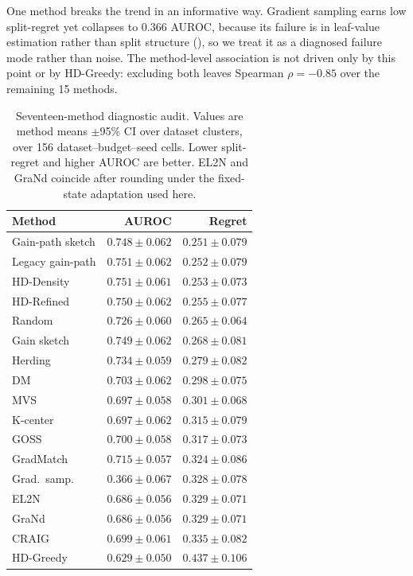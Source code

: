 One method breaks the trend in an informative way. Gradient sampling earns low
split-regret yet collapses to 0.366 AUROC, because its failure is in leaf-value
estimation rather than split structure (), so we treat it as a
diagnosed failure mode rather than noise. The
method-level association is not driven only by this point or by HD-Greedy:
excluding both leaves Spearman $\rho=-0.85$ over the remaining 15 methods.

\begin{table}[!t]
\centering
\caption{Seventeen-method diagnostic audit. Values are method means
$\pm$95\% CI over dataset clusters, over 156 dataset--budget--seed cells.
Lower split-regret and higher AUROC are better. EL2N and GraNd coincide after
rounding under the fixed-state adaptation used here.}
\label{tab:allmethods}
\tiny
\setlength{\tabcolsep}{2.5pt}
\begin{tabular}{@{}lrr@{}}
\toprule
\textbf{Method} & \textbf{AUROC} & \textbf{Regret} \\
\midrule
Gain-path sketch & $0.748\pm0.062$ & $0.251\pm0.079$ \\
Legacy gain-path & $0.751\pm0.062$ & $0.252\pm0.079$ \\
HD-Density & $0.751\pm0.061$ & $0.253\pm0.073$ \\
HD-Refined & $0.750\pm0.062$ & $0.255\pm0.077$ \\
Random & $0.726\pm0.060$ & $0.265\pm0.064$ \\
Gain sketch & $0.749\pm0.062$ & $0.268\pm0.081$ \\
Herding & $0.734\pm0.059$ & $0.279\pm0.082$ \\
DM & $0.703\pm0.062$ & $0.298\pm0.075$ \\
MVS & $0.697\pm0.058$ & $0.301\pm0.068$ \\
K-center & $0.697\pm0.062$ & $0.315\pm0.079$ \\
GOSS & $0.700\pm0.058$ & $0.317\pm0.073$ \\
GradMatch & $0.715\pm0.057$ & $0.324\pm0.086$ \\
Grad.\ samp. & $0.366\pm0.067$ & $0.328\pm0.078$ \\
EL2N & $0.686\pm0.056$ & $0.329\pm0.071$ \\
GraNd & $0.686\pm0.056$ & $0.329\pm0.071$ \\
CRAIG & $0.699\pm0.061$ & $0.335\pm0.082$ \\
HD-Greedy & $0.629\pm0.050$ & $0.437\pm0.106$ \\
\bottomrule
\end{tabular}
\end{table}

